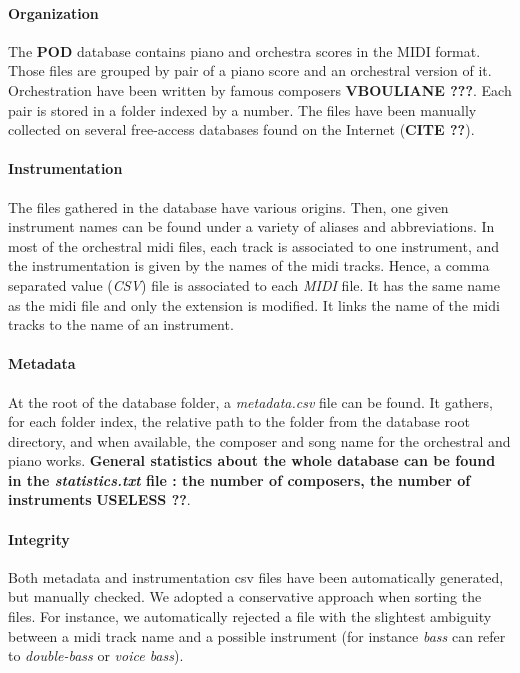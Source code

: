 \documentclass[twoside,twocolumn]{article}
\begin{document}
\paragraph{Organization}
The \textbf{POD} database contains piano and orchestra scores in the MIDI format.
Those files are grouped by pair of a piano score and an orchestral version of it. Orchestration have been written by famous composers \textbf{VBOULIANE ???}.
Each pair is stored in a folder indexed by a number.
The files have been manually collected on several free-access databases found on the Internet (\textbf{CITE ??}).

\paragraph{Instrumentation}
The files gathered in the database have various origins. Then, one given instrument names can be found under a variety of aliases and abbreviations. 
In most of the orchestral midi files, each track is associated to one instrument, and the instrumentation is given by the names of the midi tracks.
Hence, a comma separated value (\textit{CSV}) file is associated to each \textit{MIDI} file. It has the same name as the midi file and only the extension is modified. It links the name of the midi tracks to the name of an instrument.

\paragraph{Metadata}
At the root of the database folder, a \textit{metadata.csv} file can be found. It gathers, for each folder index, the relative path to the folder from the database root directory, and when available, the composer and song name for the orchestral and piano works.
\textbf{General statistics about the whole database can be found in the \textit{statistics.txt} file : the number of composers, the number of instruments} \textbf{USELESS ??}.

\paragraph{Integrity}
Both metadata and instrumentation csv files have been automatically generated, but manually checked. We adopted a conservative approach when sorting the files. For instance, we automatically rejected a file with the slightest ambiguity between a midi track name and a possible instrument (for instance \textit{bass} can refer to \textit{double-bass} or \textit{voice bass}).
\end{document}
